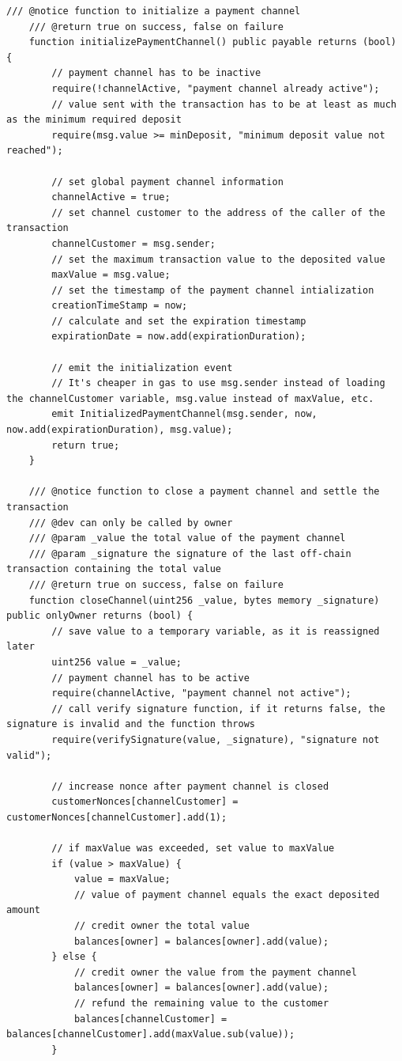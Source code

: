\begin{lstlisting}[language=Solidity, caption={Payment channel smart contract}, label={lis:pc_sc}]
    /// @notice function to initialize a payment channel
    /// @return true on success, false on failure
    function initializePaymentChannel() public payable returns (bool) {
        // payment channel has to be inactive
        require(!channelActive, "payment channel already active");
        // value sent with the transaction has to be at least as much as the minimum required deposit
        require(msg.value >= minDeposit, "minimum deposit value not reached");

        // set global payment channel information
        channelActive = true;
        // set channel customer to the address of the caller of the transaction
        channelCustomer = msg.sender;
        // set the maximum transaction value to the deposited value
        maxValue = msg.value;
        // set the timestamp of the payment channel intialization
        creationTimeStamp = now;
        // calculate and set the expiration timestamp
        expirationDate = now.add(expirationDuration);

        // emit the initialization event
        // It's cheaper in gas to use msg.sender instead of loading the channelCustomer variable, msg.value instead of maxValue, etc.
        emit InitializedPaymentChannel(msg.sender, now, now.add(expirationDuration), msg.value);
        return true;
    }

    /// @notice function to close a payment channel and settle the transaction
    /// @dev can only be called by owner
    /// @param _value the total value of the payment channel
    /// @param _signature the signature of the last off-chain transaction containing the total value
    /// @return true on success, false on failure
    function closeChannel(uint256 _value, bytes memory _signature) public onlyOwner returns (bool) {
        // save value to a temporary variable, as it is reassigned later
        uint256 value = _value;
        // payment channel has to be active
        require(channelActive, "payment channel not active");
        // call verify signature function, if it returns false, the signature is invalid and the function throws
        require(verifySignature(value, _signature), "signature not valid");

        // increase nonce after payment channel is closed
        customerNonces[channelCustomer] = customerNonces[channelCustomer].add(1);

        // if maxValue was exceeded, set value to maxValue
        if (value > maxValue) {
            value = maxValue;
            // value of payment channel equals the exact deposited amount
            // credit owner the total value
            balances[owner] = balances[owner].add(value);
        } else {
            // credit owner the value from the payment channel
            balances[owner] = balances[owner].add(value);
            // refund the remaining value to the customer
            balances[channelCustomer] = balances[channelCustomer].add(maxValue.sub(value));
        }


\end{lstlisting}

